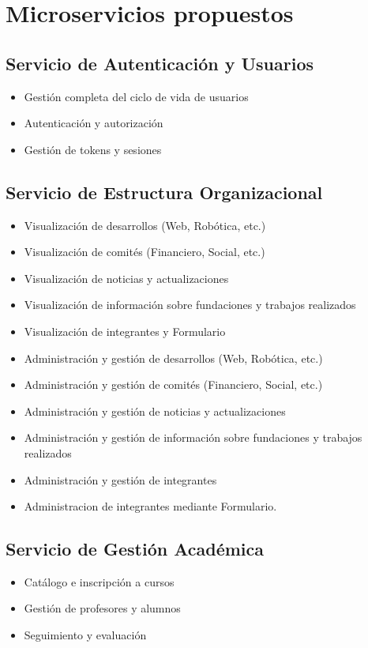 \documentclass[11pt,a4paper]{article}
\begin{document}
\section*{Microservicios propuestos}

\subsection{Servicio de Autenticación y Usuarios}
\begin{itemize}
	\item Gestión completa del ciclo de vida de usuarios
	\item Autenticación y autorización
	\item Gestión de tokens y sesiones
\end{itemize}

\subsection{Servicio de Estructura Organizacional}
\begin{itemize}
	\item Visualización de desarrollos (Web, Robótica, etc.)
	\item Visualización de comités (Financiero, Social, etc.)
	\item Visualización de noticias y actualizaciones
	\item Visualización de información sobre fundaciones y trabajos realizados
	\item Visualización de integrantes y Formulario

	\item Administración y gestión de desarrollos (Web, Robótica, etc.)
	\item Administración y gestión de comités (Financiero, Social, etc.)
	\item Administración y gestión de noticias y actualizaciones
	\item Administración y gestión de información sobre fundaciones y trabajos realizados
	\item Administración y gestión de integrantes
	\item Administracion de integrantes mediante Formulario.
\end{itemize}

\subsection{Servicio de Gestión Académica}
\begin{itemize}
	\item Catálogo e inscripción a cursos
	\item Gestión de profesores y alumnos
	\item Seguimiento y evaluación
\end{itemize}
\end{document}
